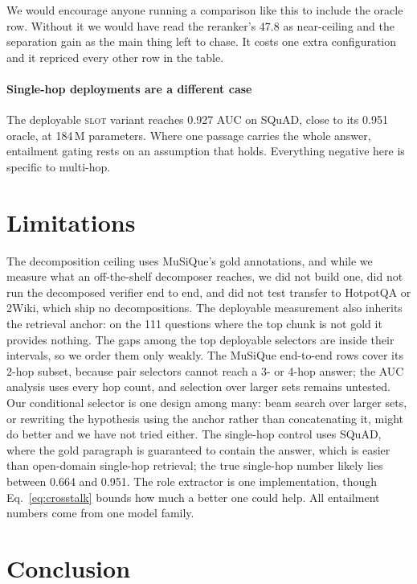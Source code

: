 \documentclass[conference]{IEEEtran}
\begin{document}
We would encourage anyone running a comparison like this to include the oracle
row. Without it we would have read the reranker's 47.8 as near-ceiling and the
separation gain as the main thing left to chase. It costs one extra
configuration and it repriced every other row in the table.

\paragraph{Single-hop deployments are a different case}
The deployable \textsc{slot} variant reaches 0.927 AUC on SQuAD, close to its
0.951 oracle, at 184\,M parameters. Where one passage carries the whole answer,
entailment gating rests on an assumption that holds. Everything negative here is
specific to multi-hop.

\section{Limitations}
\label{sec:limits}

The decomposition ceiling uses MuSiQue's gold annotations, and while we measure
what an off-the-shelf decomposer reaches, we did not build one, did not run the
decomposed verifier end to end, and did not test transfer to HotpotQA or 2Wiki,
which ship no decompositions. The deployable measurement also inherits the
retrieval anchor: on the 111 questions where the top chunk is not gold it
provides nothing. The gaps among the top deployable selectors are inside their
intervals, so we order them only weakly.
The MuSiQue end-to-end rows cover its 2-hop subset, because pair selectors
cannot reach a 3- or 4-hop answer; the AUC analysis uses every hop count, and
selection over larger sets remains untested. Our conditional
selector is one design among many: beam search over larger sets, or rewriting
the hypothesis using the anchor rather than concatenating it, might do better
and we have not tried either. The single-hop control uses SQuAD, where the gold
paragraph is guaranteed to contain the answer, which is easier than open-domain
single-hop retrieval; the true single-hop number likely lies between 0.664 and
0.951. The role extractor is one implementation, though
Eq.~\eqref{eq:crosstalk} bounds how much a better one could help. All entailment
numbers come from one model family.

\section{Conclusion}
\label{sec:conclusion}
\end{document}
